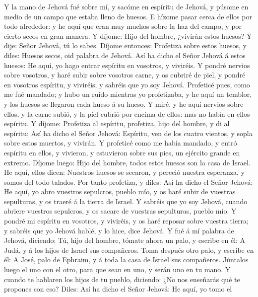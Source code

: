  Y la mano de Jehová fué sobre mí, y sacóme en espíritu de
Jehová, y púsome en medio de un campo que estaba lleno de huesos.
 E hízome pasar cerca de ellos por todo alrededor: y he aquí
que eran muy muchos sobre la haz del campo, y por cierto secos en gran
manera.  Y díjome: Hijo del hombre, ¿vivirán estos huesos? Y
dije: Señor Jehová, tú lo sabes.  Díjome entonces: Profetiza
sobre estos huesos, y diles: Huesos secos, oid palabra de Jehová.
 Así ha dicho el Señor Jehová á estos huesos: He aquí, yo
hago entrar espíritu en vosotros, y viviréis.  Y pondré
nervios sobre vosotros, y haré subir sobre vosotros carne, y os cubriré
de piel, y pondré en vosotros espíritu, y viviréis; y sabréis que yo soy
Jehová.  Profeticé pues, como me fué mandado; y hubo un
ruido mientras yo profetizaba, y he aquí un temblor, y los huesos se
llegaron cada hueso á su hueso.  Y miré, y he aquí nervios
sobre ellos, y la carne subió, y la piel cubrió por encima de ellos: mas
no había en ellos espíritu.  Y díjome: Profetiza al
espíritu, profetiza, hijo del hombre, y di al espíritu: Así ha dicho el
Señor Jehová: Espíritu, ven de los cuatro vientos, y sopla sobre estos
muertos, y vivirán.  Y profeticé como me había mandado, y
entró espíritu en ellos, y vivieron, y estuvieron sobre sus pies, un
ejército grande en extremo.  Díjome luego: Hijo del hombre,
todos estos huesos son la casa de Israel. He aquí, ellos dicen: Nuestros
huesos se secaron, y pereció nuestra esperanza, y somos del todo
talados.  Por tanto profetiza, y diles: Así ha dicho el
Señor Jehová: He aquí, yo abro vuestros sepulcros, pueblo mío, y os haré
subir de vuestras sepulturas, y os traeré á la tierra de Israel.
 Y sabréis que yo soy Jehová, cuando abriere vuestros
sepulcros, y os sacare de vuestras sepulturas, pueblo mío. 
Y pondré mi espíritu en vosotros, y viviréis, y os haré reposar sobre
vuestra tierra; y sabréis que yo Jehová hablé, y lo hice, dice Jehová.
 Y fué á mí palabra de Jehová, diciendo:  Tú,
hijo del hombre, tómate ahora un palo, y escribe en él: A Judá, y á los
hijos de Israel sus compañeros. Toma después otro palo, y escribe en él:
A José, palo de Ephraim, y á toda la casa de Israel sus compañeros.
 Júntalos luego el uno con el otro, para que sean en uno, y
serán uno en tu mano.  Y cuando te hablaren los hijos de tu
pueblo, diciendo: ¿No nos enseñarás qué te propones con eso?
 Diles: Así ha dicho el Señor Jehová: He aquí, yo tomo el
